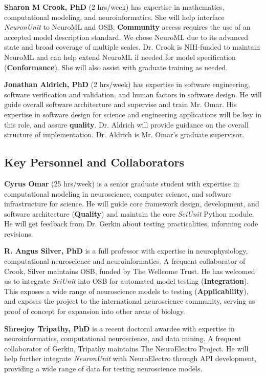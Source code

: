 \documentclass[11pt,letterpaper]{article}
\begin{document}
\textbf{Sharon M Crook, PhD} (2 hrs/week) has expertise in mathematics, computational modeling, and neuroinformatics.  She will help interface \textit{NeuronUnit} to NeuroML and OSB. \textbf{Community} access requires the use of an accepted model description standard.  We chose NeuroML due to its advanced state and broad coverage of multiple scales.  Dr. Crook is NIH-funded to maintain NeuroML and can help extend NeuroML if needed for model specification (\textbf{Conformance}).  She will also assist with graduate training as needed.  

\textbf{Jonathan Aldrich, PhD} (2 hrs/week) has expertise in software engineering, software verification and validation, and human factors in software design. He will guide overall software architecture and supervise and train Mr. Omar.  His expertise in software design for science and engineering applications will be key in this role, and assure \textbf{quality}.  Dr. Aldrich will provide guidance on the overall structure of implementation.  Dr. Aldrich is Mr. Omar's graduate supervisor.  

\subsection{Key Personnel and Collaborators}
\textbf{Cyrus Omar} (25 hrs/week) is a senior graduate student with expertise in computational modeling in neuroscience, computer science, and software infrastructure for science.  He will guide core framework design, development, and software architecture (\textbf{Quality}) and maintain the core \textit{SciUnit} Python module.  He will get feedback from Dr. Gerkin about testing practicalities, informing code revisions.  

\textbf{R. Angus Silver, PhD} is a full professor with expertise in neurophysiology, computational neuroscience and neuroinformatics.  
A frequent collaborator of Crook, Silver maintains OSB, funded by The Wellcome Trust.  
He has welcomed us to integrate \textit{SciUnit} into OSB for automated model testing (\textbf{Integration}).  
This exposes a wide range of neuroscience models to testing (\textbf{Applicability}), and exposes the project to the international neuroscience community, serving as proof of concept for expansion into other areas of biology.  

\textbf{Shreejoy Tripathy, PhD} is a recent doctoral awardee with expertise in neuroinformatics, computational neuroscience, and data mining.  A frequent collaborator of Gerkin, Tripathy maintains The NeuroElectro Project.  He will help further integrate \textit{NeuronUnit} with NeuroElectro through API development, providing a wide range of data for testing neuroscience models.  
\end{document}
